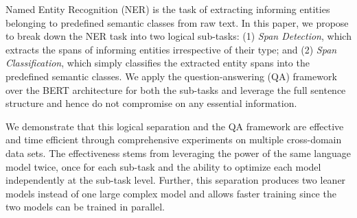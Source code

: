 Named Entity Recognition (NER) is the task of extracting informing entities belonging to predefined semantic classes from raw text. In this paper, we propose to break down the NER task into two logical sub-tasks: (1) \textit{Span Detection}, which extracts the spans of informing entities irrespective of their type; and (2) \textit{Span Classification}, which simply classifies the extracted entity spans into the predefined semantic classes. 
We apply the question-answering (QA) framework over the BERT architecture for both the sub-tasks and leverage the full sentence structure and hence do not compromise on any essential information.

We demonstrate that this logical separation and the QA framework are  effective and  time efficient through comprehensive experiments on multiple cross-domain data sets. The effectiveness stems from leveraging the power of the same language model twice, once for each sub-task and the ability to optimize each model independently at the sub-task level.   
Further, this separation produces two leaner models instead of one large complex model and allows faster training since the two models can be trained in parallel.

